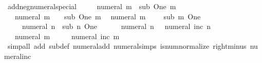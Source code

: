 \begin{isabellebody}
\ add{\isacharunderscore}{\kern0pt}neg{\isacharunderscore}{\kern0pt}numeral{\isacharunderscore}{\kern0pt}special{\isacharcolon}{\kern0pt}\isanewline
\ \ {\isachardoublequoteopen}{}\ {\isacharplus}{\kern0pt}\ {\isacharminus}{\kern0pt}\ numeral\ m\ {\isacharequal}{\kern0pt}\ sub\ One\ m{\isachardoublequoteclose}\isanewline
\ \ {\isachardoublequoteopen}{\isacharminus}{\kern0pt}\ numeral\ m\ {\isacharplus}{\kern0pt}\ {}\ {\isacharequal}{\kern0pt}\ sub\ One\ m{\isachardoublequoteclose}\isanewline
\ \ {\isachardoublequoteopen}numeral\ m\ {\isacharplus}{\kern0pt}\ {\isacharminus}{\kern0pt}\ {}\ {\isacharequal}{\kern0pt}\ sub\ m\ One{\isachardoublequoteclose}\isanewline
\ \ {\isachardoublequoteopen}{\isacharminus}{\kern0pt}\ {}\ {\isacharplus}{\kern0pt}\ numeral\ n\ {\isacharequal}{\kern0pt}\ sub\ n\ One{\isachardoublequoteclose}\isanewline
\ \ {\isachardoublequoteopen}{\isacharminus}{\kern0pt}\ {}\ {\isacharplus}{\kern0pt}\ {\isacharminus}{\kern0pt}\ numeral\ n\ {\isacharequal}{\kern0pt}\ {\isacharminus}{\kern0pt}\ numeral\ {\isacharparenleft}{\kern0pt}inc\ n{\isacharparenright}{\kern0pt}{\isachardoublequoteclose}\isanewline
\ \ {\isachardoublequoteopen}{\isacharminus}{\kern0pt}\ numeral\ m\ {\isacharplus}{\kern0pt}\ {\isacharminus}{\kern0pt}\ {}\ {\isacharequal}{\kern0pt}\ {\isacharminus}{\kern0pt}\ numeral\ {\isacharparenleft}{\kern0pt}inc\ m{\isacharparenright}{\kern0pt}{\isachardoublequoteclose}\isanewline
\ \ {\isachardoublequoteopen}{}\ {\isacharplus}{\kern0pt}\ {\isacharminus}{\kern0pt}\ {}\ {\isacharequal}{\kern0pt}\ {}{\isachardoublequoteclose}\isanewline
\ \ {\isachardoublequoteopen}{\isacharminus}{\kern0pt}\ {}\ {\isacharplus}{\kern0pt}\ {}\ {\isacharequal}{\kern0pt}\ {}{\isachardoublequoteclose}\isanewline
\ \ {\isachardoublequoteopen}{\isacharminus}{\kern0pt}\ {}\ {\isacharplus}{\kern0pt}\ {\isacharminus}{\kern0pt}\ {}\ {\isacharequal}{\kern0pt}\ {\isacharminus}{\kern0pt}\ {}{\isachardoublequoteclose}\isanewline
%
\isadelimproof
\ \ %
\endisadelimproof
%
\isatagproof
{}\isamarkupfalse%
\ {\isacharparenleft}{\kern0pt}simp{\isacharunderscore}{\kern0pt}all\ add{\isacharcolon}{\kern0pt}\ sub{\isacharunderscore}{\kern0pt}def\ numeral{\isacharunderscore}{\kern0pt}add\ numeral{\isachardot}{\kern0pt}simps\ is{\isacharunderscore}{\kern0pt}num{\isacharunderscore}{\kern0pt}normalize\ right{\isacharunderscore}{\kern0pt}minus\ numeral{\isacharunderscore}{\kern0pt}inc\isanewline

\end{isabellebody}
